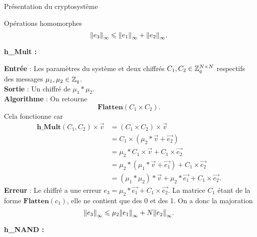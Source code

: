 \begin{section}{Présentation du cryptosystème}
\begin{subsection}{Opérations homomorphes}
\[{\|e_3\|}_{\infty} \leqslant {\|e_1\|}_{\infty} + {\|e_2\|}_{\infty}.\] 


\begin{samepage}
\vspace{0.5cm}\noindent\textbf{h\_Mult :}
\flushleft
	
	\textbf{Entrée} : Les paramètres du système et deux chiffrés $C_1, C_2 \in \mathbb{Z}_q^{N \times N}$ respectifs des messages $\mu_1, \mu_2 \in \mathbb{Z}_q$.\\
	\textbf{Sortie} : Un chiffré de $\mu_1 * \mu_2$. \\
	\textbf{Algorithme} : On retourne \[\textbf{Flatten}(C_1 \times C_2).\]
	Cela fonctionne car
	\begin{align*}
	\textbf{h\_Mult}(C_1, C_2) \times \vec{v} &= (C_1 \times C_2) \times \vec{v} \\
	&= C_1 \times (\mu_2 * \vec{v} + \vec{e_2}) \\
	&= \mu_2 * C_1 \times \vec{v} + C_1 \times \vec{e_2} \\
	&= \mu_2 * (\mu_1 * \vec{v} + \vec{e_1}) + C_1 \times \vec{e_2} \\
	&= (\mu_1 * \mu_2) * \vec{v} + \mu_2 * \vec{e_1} + C_1 \times \vec{e_2}.
	\end{align*}
	\textbf{Erreur} : Le chiffré a une erreur $e_3 = \mu_2 * \vec{e_1} + C_1 \times \vec{e_2}$. La matrice $C_1$ étant de la forme $\textbf{Flatten}(c_1)$, elle ne contient que des 0 et des 1. On a donc la majoration
\[{\|e_3\|}_{\infty} \leqslant \mu_2 {\|e_1\|}_{\infty} + N {\|e_2\|}_{\infty}. \]
\end{samepage}

\vspace{0.5cm}\noindent\textbf{h\_NAND :}
\flushleft
	

\end{subsection}
\end{section}
